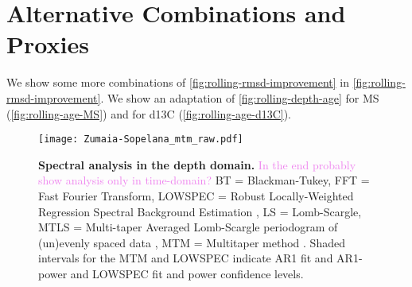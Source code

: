 \documentclass[draft]{agujournal2019}
\newcommand{\ijk}{\textcolor{violet}}
\begin{document}
%
%



%
%
%
%
\appendix

\section{Alternative Combinations and Proxies}

We show some more combinations of \cref{fig:rolling-rmsd-improvement} in \cref{fig:rolling-rmsd-improvement}.
We show an adaptation of \cref{fig:rolling-depth-age} for \gls{MS} (\cref{fig:rolling-age-MS}) and for \gls{d13C} (\cref{fig:rolling-age-d13C}).

\begin{figure}[htb]
  \centering \texttt{[image: Zumaia-Sopelana\_mtm\_raw.pdf]}
  \caption{\label{fig:spectral-depth}
    \textbf{Spectral analysis in the depth domain.}
    \ijk{In the end probably show analysis only in time-domain?}
    BT = Blackman-Tukey,
    FFT = Fast Fourier Transform,
    LOWSPEC = Robust Locally-Weighted Regression Spectral Background Estimation \cite{Meyers2012},
    LS = Lomb-Scargle,
    MTLS = Multi-taper Averaged Lomb-Scargle periodogram of (un)evenly
spaced data \cite{Springford2020},
    MTM = Multitaper method \cite{Thomson1982}.
    Shaded intervals for the MTM and LOWSPEC indicate AR1 fit and AR1-power and LOWSPEC fit and power confidence levels.
  }
\end{figure}
\end{document}
